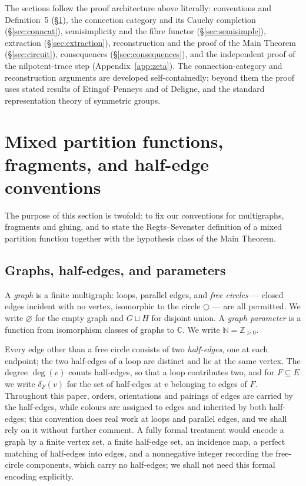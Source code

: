 \documentclass[11pt]{article}
\newcommand{\emptygraph}{\varnothing}
\newcommand{\freecircle}{\bigcirc}
\newcommand{\halfedges}[2]{\delta_{#1}(#2)}       %
\begin{document}
The sections follow the proof architecture above literally:
conventions and Definition~5 (\S\ref{sec:prelim}), the connection
category and its Cauchy completion (\S\ref{sec:conncat}),
semisimplicity and the fibre functor (\S\ref{sec:semisimple}),
extraction (\S\ref{sec:extraction}), reconstruction and the proof
of the Main Theorem (\S\ref{sec:circuit}), consequences
(\S\ref{sec:consequences}), and the independent proof of the
nilpotent-trace step (Appendix~\ref{app:zeta}). The
connection-category and reconstruction arguments are developed
self-containedly; beyond them the proof uses stated results of
Etingof--Penneys and of Deligne, and the standard representation
theory of symmetric groups.

\section[Mixed partition functions, fragments, and half-edge
conventions]{Mixed partition functions, fragments, and half-edge
\mbox{conventions}}\label{sec:prelim}

The purpose of this section is twofold: to fix our conventions for
multigraphs, fragments and gluing, and to state the Regts--Sevenster
definition of a mixed partition function together with the hypothesis
class of the Main Theorem.

\subsection{Graphs, half-edges, and parameters}\label{subsec:graphs}

A \emph{graph} is a finite multigraph: loops, parallel edges, and
\emph{free circles} --- closed edges incident with no vertex,
isomorphic to the circle $\freecircle$ --- are all permitted. We write
$\emptygraph$ for the empty graph and $G\sqcup H$ for disjoint union.
A \emph{graph parameter} is a function from isomorphism classes of
graphs to $\mathbb{C}$. We write $\mathbb{N}=\mathbb{Z}_{\ge0}$.

Every edge other than a free circle consists of two \emph{half-edges},
one at each endpoint; the two half-edges of a loop are distinct and
lie at the same vertex. The degree $\deg(v)$ counts half-edges, so
that a loop contributes two, and for $F\subseteq E$ we write
$\halfedges{F}{v}$ for the set of half-edges at $v$ belonging to edges
of $F$. Throughout this paper, orders, orientations and pairings of edges
are carried by the half-edges, while colours are assigned to edges
and inherited by both half-edges; this convention does real work at
loops and parallel edges, and we shall rely on it without further
comment. A fully formal
treatment would encode a graph by a finite
vertex set, a finite half-edge set, an incidence map, a perfect
matching of half-edges into edges, and a nonnegative integer
recording the free-circle components, which carry no half-edges;
we shall not need this formal encoding explicitly.
\end{document}
